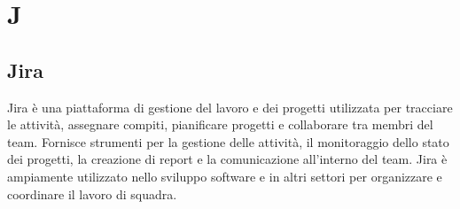 \section{J}
\subsection{Jira}
Jira è una piattaforma di gestione del lavoro e dei progetti utilizzata per
tracciare le attività, assegnare compiti, pianificare progetti e collaborare
tra membri del team. Fornisce strumenti per la gestione delle attività, il
monitoraggio dello stato dei progetti, la creazione di report e la
comunicazione all'interno del team. Jira è ampiamente utilizzato nello sviluppo
software e in altri settori per organizzare e coordinare il lavoro di squadra.
